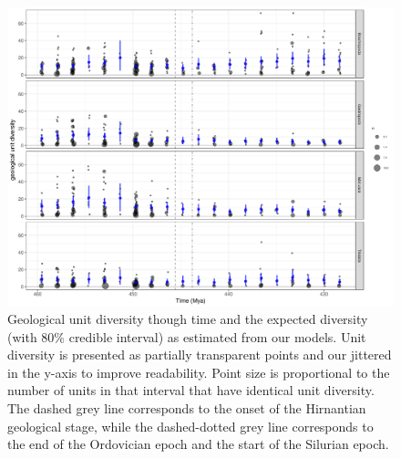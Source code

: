 \documentclass[12pt,letterpaper]{article}
\begin{document}
\begin{figure}[ht]
  \centering
  \includegraphics[width=\textwidth,height=0.5\textheight,keepaspectratio=true]{figure/unitdiv_time}
  \caption{Geological unit diversity though time and the expected diversity (with 80\% credible interval) as estimated from our models. Unit diversity is presented as partially transparent points and our jittered in the y-axis to improve readability. Point size is proportional to the number of units in that interval that have identical unit diversity. The dashed grey line corresponds to the onset of the Hirnantian geological stage, while the dashed-dotted grey line corresponds to the end of the Ordovician epoch and the start of the Silurian epoch.}
  \label{fig:time_div}
\end{figure}
\end{document}
